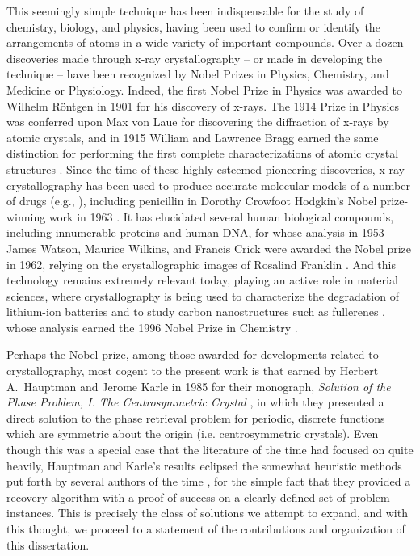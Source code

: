 This seemingly simple technique has been indispensable for the study of chemistry, biology, and physics, having been used to confirm or identify the arrangements of atoms in a wide variety of important compounds.  Over a dozen discoveries made through x-ray crystallography -- or made in developing the technique -- have been recognized by Nobel Prizes in Physics, Chemistry, and Medicine or Physiology.  Indeed, the first Nobel Prize in Physics was awarded to Wilhelm R\"ontgen in 1901 for his discovery of x-rays.  The 1914 Prize in Physics was conferred upon Max von Laue for discovering the diffraction of x-rays by atomic crystals, and in 1915 William and Lawrence Bragg earned the same distinction for performing the first complete characterizations of atomic crystal structures \cite{galli2014nobel}.  Since the time of these highly esteemed pioneering discoveries, x-ray crystallography has been used to produce accurate molecular models of a number of drugs (e.g., \cite{cell2001antibios, rasmussen2007adrenergic, schindler2000kinase}), including penicillin in Dorothy Crowfoot Hodgkin's Nobel prize-winning work in 1963 \cite{hodgkin1963penicillin}.  It has elucidated several human biological compounds, including innumerable proteins \cite{kimber2003protein, varsani1993isomerase} and human DNA, for whose analysis in 1953 James Watson, Maurice Wilkins, and Francis Crick were awarded the Nobel prize in 1962, relying on the crystallographic images of Rosalind Franklin \cite{franklin1953nature,watson1962nobel_lecture,watson1953nature,wilkins1953nature}.  And this technology remains extremely relevant today, playing an active role in material sciences, where crystallography is being used to characterize the degradation of lithium-ion batteries \cite{hausbrand2015battery, andrej2018battery} and to study carbon nanostructures such as fullerenes \cite{lamb1990carbon, kroto1985fullerene}, whose analysis earned the 1996 Nobel Prize in Chemistry \cite{galli2014nobel}.

Perhaps the Nobel prize, among those awarded for developments related to crystallography, most cogent to the present work is that earned by Herbert A.~Hauptman and Jerome Karle in 1985 for their monograph, \emph{Solution of the Phase Problem, I.  The Centrosymmetric Crystal} \cite{hauptman1953monograph}, in which they presented a direct solution to the phase retrieval problem for periodic, discrete functions which are symmetric about the origin (i.e. centrosymmetric crystals).  Even though this was a special case that the literature of the time had focused on quite heavily, Hauptman and Karle's results eclipsed the somewhat heuristic methods put forth by several authors of the time \cite{harker1948phases,sayre1952shannon}, for the simple fact that they provided a recovery algorithm with a proof of success on a clearly defined set of problem instances.  This is precisely the class of solutions we attempt to expand, and with this thought, we proceed to a statement of the contributions and organization of this dissertation.
